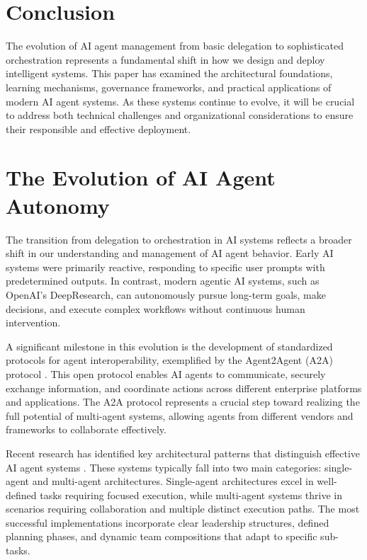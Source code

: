 \documentclass[conference]{IEEEtran}
\begin{document}
\section{Conclusion}
The evolution of AI agent management from basic delegation to sophisticated orchestration represents a fundamental shift in how we design and deploy intelligent systems. This paper has examined the architectural foundations, learning mechanisms, governance frameworks, and practical applications of modern AI agent systems. As these systems continue to evolve, it will be crucial to address both technical challenges and organizational considerations to ensure their responsible and effective deployment.

\section{The Evolution of AI Agent Autonomy}
The transition from delegation to orchestration in AI systems reflects a broader shift in our understanding and management of AI agent behavior. Early AI systems were primarily reactive, responding to specific user prompts with predetermined outputs. In contrast, modern agentic AI systems, such as OpenAI's DeepResearch, can autonomously pursue long-term goals, make decisions, and execute complex workflows without continuous human intervention.

A significant milestone in this evolution is the development of standardized protocols for agent interoperability, exemplified by the Agent2Agent (A2A) protocol \cite{google2025a2a}. This open protocol enables AI agents to communicate, securely exchange information, and coordinate actions across different enterprise platforms and applications. The A2A protocol represents a crucial step toward realizing the full potential of multi-agent systems, allowing agents from different vendors and frameworks to collaborate effectively.

Recent research has identified key architectural patterns that distinguish effective AI agent systems \cite{masterman2024landscape}. These systems typically fall into two main categories: single-agent and multi-agent architectures. Single-agent architectures excel in well-defined tasks requiring focused execution, while multi-agent systems thrive in scenarios requiring collaboration and multiple distinct execution paths. The most successful implementations incorporate clear leadership structures, defined planning phases, and dynamic team compositions that adapt to specific sub-tasks.
\end{document}
